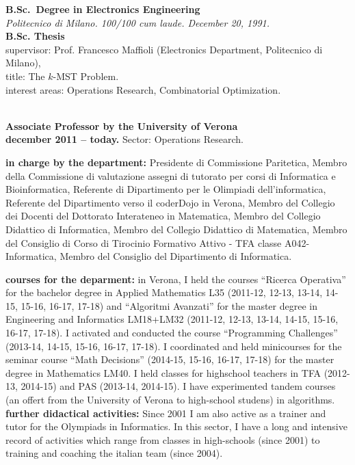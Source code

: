 \documentclass[10pt]{article}
\newcommand{\voice}[1] { \bigskip \medskip \noindent {\Large \bf #1} \medskip\\ }
\newcommand{\subvoice}[1] { {\large \bf #1} \smallskip\\ }
\newcommand{\emp}[1] { {\em #1}\\ }
\begin{document}
\subvoice{B.Sc.~Degree in Electronics Engineering}
\emp{Politecnico di Milano. 100/100 cum laude. December 20, 1991.}

\subvoice{B.Sc. Thesis}
{\sc supervisor:} Prof. Francesco Maffioli (Electronics Department,   
                Politecnico di Milano), \\
{\sc title:} The $k$-MST Problem.\\
{\sc interest areas:} Operations Research, Combinatorial Optimization.\\


\vspace{1.8mm}

\voice{{\LARGE Present employment}}

\subvoice{Associate Professor by the
          University of Verona}
{\bf december 2011 -- today.}
Sector: Operations Research.

{\bf in charge by the department:} Presidente di Commissione Paritetica, Membro della Commissione di valutazione assegni di tutorato per corsi di Informatica e Bioinformatica, Referente di Dipartimento per le Olimpiadi dell'informatica, Referente del Dipartimento verso il coderDojo in Verona, Membro del Collegio dei Docenti del Dottorato Interateneo in Matematica, Membro del Collegio Didattico di Informatica, Membro del Collegio Didattico di Matematica, Membro del Consiglio di Corso di Tirocinio Formativo Attivo - TFA classe A042- Informatica, Membro del Consiglio del Dipartimento di Informatica.

{\bf courses for the deparment:} in Verona,
I held the courses ``Ricerca Operativa''
for the bachelor degree in Applied Mathematics L35 (2011-12, 12-13, 13-14, 14-15, 15-16, 16-17, 17-18)
and ``Algoritmi Avanzati''
for the master degree in Engineering and Informatics LM18+LM32 (2011-12, 12-13, 13-14, 14-15, 15-16, 16-17, 17-18).
I activated and conducted the course ``Programming Challenges'' (2013-14, 14-15, 15-16, 16-17, 17-18).
I coordinated and held minicourses for the seminar course ``Math Decisions'' (2014-15, 15-16, 16-17, 17-18) for the master degree in Mathematics LM40. 
I held classes for highschool teachers in TFA (2012-13, 2014-15) and PAS (2013-14, 2014-15).
I have experimented tandem courses (an offert from the University of Verona to high-school studens) in algorithms.\\

{\bf further didactical activities:}
Since 2001 I am also active as a trainer and tutor for the Olympiads in Informatics.
In this sector, I have a long and intensive record of activities
which range from classes in high-schools (since 2001) to training and coaching
the italian team (since 2004).\\
\end{document}
